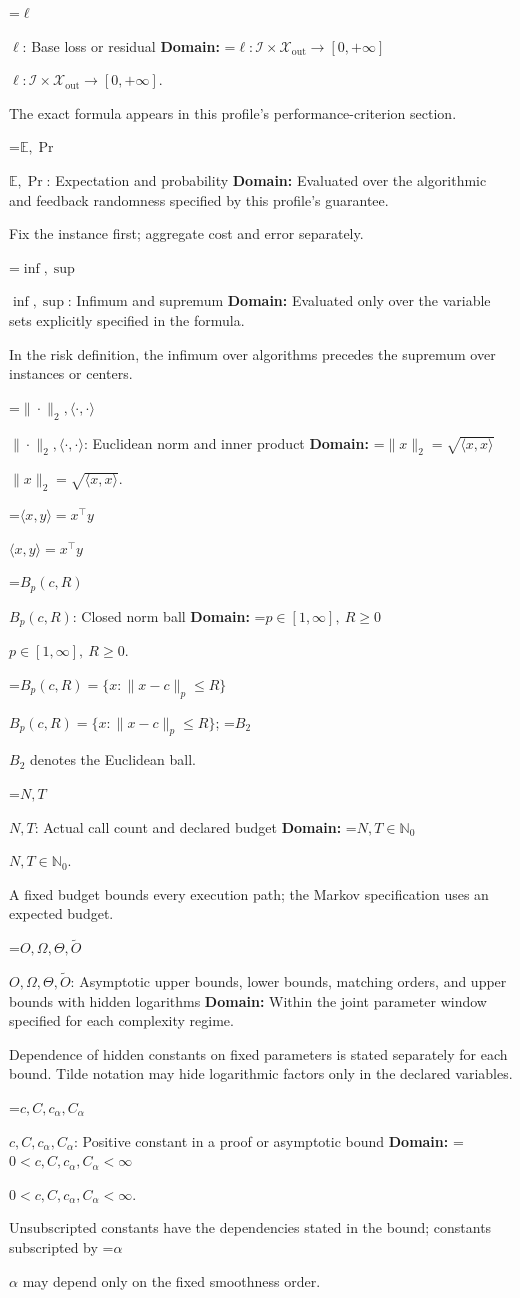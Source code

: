 \documentclass[10pt,a4paper]{article}
\newcommand{\AtlasMath}[1]{\par\begingroup\centering\setbox0=\hbox{$\displaystyle #1$}\ifdim\wd0>1.4\linewidth\typeout{ATLAS WIDE FORMULA: \the\wd0}\fi\ifdim\wd0>\linewidth\resizebox{\linewidth}{!}{\box0}\else\box0\fi\par\endgroup}
\newcommand{\AtlasInlineMath}[1]{\begingroup\setbox0=\hbox{$#1$}\ifdim\wd0>.4\linewidth\endgroup\AtlasMath{#1}\else\endgroup$#1$\fi}
\begin{document}
\AtlasInlineMath{\ell}: Base loss or residual \textbf{Domain:} \AtlasInlineMath{\ell:\mathcal{I}\times\mathcal{X}_{\mathrm{out}}\to[0,+\infty]}.

The exact formula appears in this profile's performance-criterion section.

\AtlasInlineMath{\mathbb{E},\Pr}: Expectation and probability \textbf{Domain:} Evaluated over the algorithmic and feedback randomness specified by this profile's guarantee.

Fix the instance first; aggregate cost and error separately.

\AtlasInlineMath{\inf,\sup}: Infimum and supremum \textbf{Domain:} Evaluated only over the variable sets explicitly specified in the formula.

In the risk definition, the infimum over algorithms precedes the supremum over instances or centers.

\AtlasInlineMath{\|\cdot\|_2,\langle\cdot,\cdot\rangle}: Euclidean norm and inner product \textbf{Domain:} \AtlasInlineMath{\|x\|_2=\sqrt{\langle x,x\rangle}}.

\AtlasInlineMath{\langle x,y\rangle=x^\top y}

\AtlasInlineMath{B_p(c,R)}: Closed norm ball \textbf{Domain:} \AtlasInlineMath{p\in[1,\infty],\ R\ge0}.

\AtlasInlineMath{B_p(c,R)=\{x:\|x-c\|_p\le R\}}; \AtlasInlineMath{B_2} denotes the Euclidean ball.

\AtlasInlineMath{N,T}: Actual call count and declared budget \textbf{Domain:} \AtlasInlineMath{N,T\in\mathbb{N}_0}.

A fixed budget bounds every execution path; the Markov specification uses an expected budget.

\AtlasInlineMath{O,\Omega,\Theta,\widetilde{O}}: Asymptotic upper bounds, lower bounds, matching orders, and upper bounds with hidden logarithms \textbf{Domain:} Within the joint parameter window specified for each complexity regime.

Dependence of hidden constants on fixed parameters is stated separately for each bound. Tilde notation may hide logarithmic factors only in the declared variables.

\AtlasInlineMath{c,C,c_\alpha,C_\alpha}: Positive constant in a proof or asymptotic bound \textbf{Domain:} \AtlasInlineMath{0<c,C,c_\alpha,C_\alpha<\infty}.

Unsubscripted constants have the dependencies stated in the bound; constants subscripted by \AtlasInlineMath{\alpha} may depend only on the fixed smoothness order.
\end{document}
